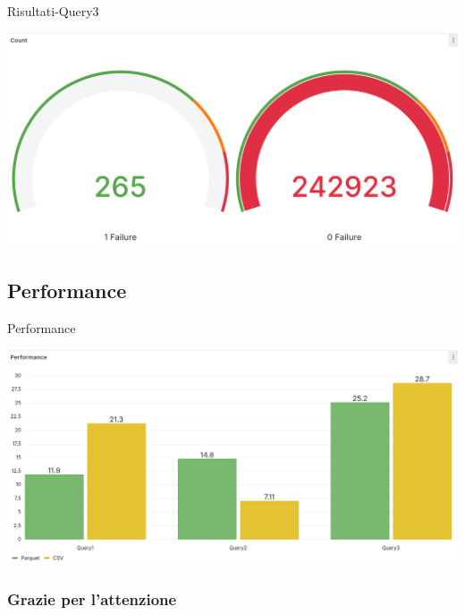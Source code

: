 \documentclass[13pt,aspectratio=169,t,xcolor=table]{beamer}
\begin{document}
\begin{frame}{Risultati-Query3}
    \begin{minipage}{0.9\textwidth}
        \begin{adjustbox}{margin=1cm 0cm 1.5cm 0cm, center}
            \includegraphics[width=1\textwidth]{res/query3_panel2.png}
        \end{adjustbox}
    \end{minipage}
\end{frame}

\subsection{Performance}
\begin{frame}{Performance}
    \begin{minipage}{0.9\textwidth}
        \begin{adjustbox}{margin=0cm 0cm 0cm 0cm, center}
            \includegraphics[width=1\textwidth]{res/performance_panel.png}
        \end{adjustbox}
    \end{minipage}
\end{frame}

\begin{frame}{}
    \frametitle{Grazie per l'attenzione}
\end{frame}
\end{document}
